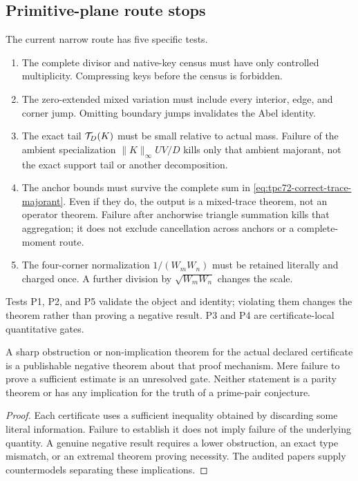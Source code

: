\subsection{Primitive-plane route stops}

The current narrow route has five specific tests.
\begin{enumerate}[label=\textup{(P\arabic*)},leftmargin=3.6em]
 \item The complete divisor and native-key census must have only controlled
       multiplicity.  Compressing keys before the census is forbidden.
 \item The zero-extended mixed variation must include every interior, edge,
       and corner jump.  Omitting boundary jumps invalidates the Abel
       identity.
 \item The exact tail \(\mathcal T_D(K)\) must be small relative to actual mass.
       Failure of the ambient specialization
       \(\|K\|_\infty UV/D\) kills only that ambient majorant, not the exact
       support tail or another decomposition.
 \item The anchor bounds must survive the complete sum in
       \eqref{eq:tpc72-correct-trace-majorant}.  Even if they do, the output
       is a mixed-trace theorem, not an operator theorem.  Failure after
       anchorwise triangle summation kills that aggregation; it does not
       exclude cancellation across anchors or a complete-moment route.
 \item The four-corner normalization \(1/(W_mW_n)\) must be retained
       literally and charged once.  A further division by
       \(\sqrt{W_mW_n}\) changes the scale.
\end{enumerate}
Tests P1, P2, and P5 validate the object and identity; violating them changes
the theorem rather than proving a negative result.  P3 and P4 are
certificate-local quantitative gates.

\begin{proposition}
\label{prop:route-obstruction}
A sharp obstruction or non-implication theorem for the actual declared
certificate is a publishable negative theorem about that proof mechanism.
Mere failure to prove a sufficient estimate is an unresolved gate.  Neither
statement is a parity theorem or has any implication for the truth of a
prime-pair conjecture.
\end{proposition}

\begin{proof}
Each certificate uses a sufficient inequality obtained by discarding some
literal information.  Failure to establish it does not imply failure of the
underlying quantity.  A genuine negative result requires a lower
obstruction, an exact type mismatch, or an extremal theorem proving
necessity.  The audited papers supply countermodels separating these
implications.
\end{proof}
